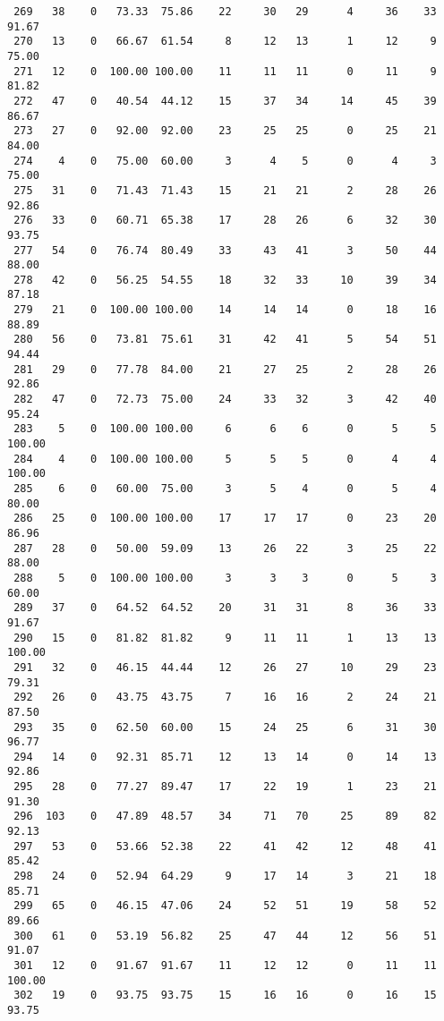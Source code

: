\begin{verbatim}
 269   38    0   73.33  75.86    22     30   29      4     36    33    91.67
 270   13    0   66.67  61.54     8     12   13      1     12     9    75.00
 271   12    0  100.00 100.00    11     11   11      0     11     9    81.82
 272   47    0   40.54  44.12    15     37   34     14     45    39    86.67
 273   27    0   92.00  92.00    23     25   25      0     25    21    84.00
 274    4    0   75.00  60.00     3      4    5      0      4     3    75.00
 275   31    0   71.43  71.43    15     21   21      2     28    26    92.86
 276   33    0   60.71  65.38    17     28   26      6     32    30    93.75
 277   54    0   76.74  80.49    33     43   41      3     50    44    88.00
 278   42    0   56.25  54.55    18     32   33     10     39    34    87.18
 279   21    0  100.00 100.00    14     14   14      0     18    16    88.89
 280   56    0   73.81  75.61    31     42   41      5     54    51    94.44
 281   29    0   77.78  84.00    21     27   25      2     28    26    92.86
 282   47    0   72.73  75.00    24     33   32      3     42    40    95.24
 283    5    0  100.00 100.00     6      6    6      0      5     5   100.00
 284    4    0  100.00 100.00     5      5    5      0      4     4   100.00
 285    6    0   60.00  75.00     3      5    4      0      5     4    80.00
 286   25    0  100.00 100.00    17     17   17      0     23    20    86.96
 287   28    0   50.00  59.09    13     26   22      3     25    22    88.00
 288    5    0  100.00 100.00     3      3    3      0      5     3    60.00
 289   37    0   64.52  64.52    20     31   31      8     36    33    91.67
 290   15    0   81.82  81.82     9     11   11      1     13    13   100.00
 291   32    0   46.15  44.44    12     26   27     10     29    23    79.31
 292   26    0   43.75  43.75     7     16   16      2     24    21    87.50
 293   35    0   62.50  60.00    15     24   25      6     31    30    96.77
 294   14    0   92.31  85.71    12     13   14      0     14    13    92.86
 295   28    0   77.27  89.47    17     22   19      1     23    21    91.30
 296  103    0   47.89  48.57    34     71   70     25     89    82    92.13
 297   53    0   53.66  52.38    22     41   42     12     48    41    85.42
 298   24    0   52.94  64.29     9     17   14      3     21    18    85.71
 299   65    0   46.15  47.06    24     52   51     19     58    52    89.66
 300   61    0   53.19  56.82    25     47   44     12     56    51    91.07
 301   12    0   91.67  91.67    11     12   12      0     11    11   100.00
 302   19    0   93.75  93.75    15     16   16      0     16    15    93.75

\end{verbatim}
